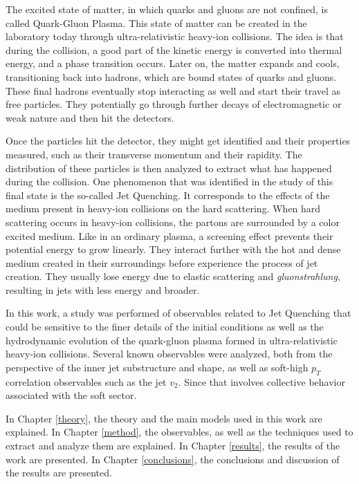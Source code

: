The excited state of matter, in which quarks and gluons are not confined, is called Quark-Gluon Plasma. This state of matter can be created in the laboratory today through ultra-relativistic heavy-ion collisions. The idea is that during the collision, a good part of the kinetic energy is converted into thermal energy, and a phase transition occurs. Later on, the matter expands and cools, transitioning back into hadrons, which are bound states of quarks and gluons. These final hadrons eventually stop interacting as well and start their travel as free particles. They potentially go through further decays of electromagnetic or weak nature and then hit the detectors.
\par
Once the particles hit the detector, they might get identified and their properties measured, such as their transverse momentum and their rapidity. The distribution of these particles is then analyzed to extract what has happened during the collision. One phenomenon that was identified in the study of this final state is the so-called Jet Quenching. It corresponds to the effects of the medium present in heavy-ion collisions on the hard scattering. When hard scattering occurs in heavy-ion collisions, the partons are surrounded by a color excited medium. Like in an ordinary plasma, a screening effect prevents their potential energy to grow linearly. They interact further with the hot and dense medium created in their surroundings before experience the process of jet creation. They usually lose energy due to elastic scattering and \emph{gluonstrahlung}, resulting in jets with less energy and broader.
\par
In this work, a study was performed of observables related to Jet Quenching that could be sensitive to the finer details of the initial conditions as well as the hydrodynamic evolution of the quark-gluon plasma formed in ultra-relativistic heavy-ion collisions. Several known observables were analyzed, both from the perspective of the inner jet substructure and shape, as well as soft-high $p_T$ correlation observables such as the jet $v_2$. Since that involves collective behavior associated with the soft sector.
\par
In Chapter \ref{theory}, the theory and the main models used in this work are explained. In Chapter \ref{method}, the observables, as well as the techniques used to extract and analyze them are explained. In Chapter \ref{results}, the results of the work are presented. In Chapter \ref{conclusions}, the conclusions and discussion of the results are presented.
